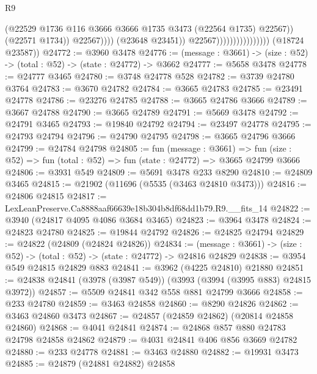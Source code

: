 \begin{lexlean}{R9}
\begin{coremodule}
                                                    (@22529
                                                      @1736
                                                      @116
                                                      @3666
                                                      @3666
                                                      @1735
                                                      @3473
                                                      (@22564 @1735)
                                                      @22567))
                                                  (@22571 @1734))
                                                @22567))))
                                        (@23648 @23451))
                                      @22567))))))))))))))))
      (@18724 @23587))
@24772 := @3960 @3478
@24776 := (message : @3661) -> (size : @52) -> (total : @52) -> (state : @24772) -> @3662
@24777 := @5658 @3478
@24778 := @24777 @3465
@24780 := @3748 @24778 @528
@24782 := @3739 @24780 @3764
@24783 := @3670 @24782
@24784 := @3665 @24783
@24785 := @23491 @24778
@24786 := @23276 @24785
@24788 := @3665 @24786 @3666
@24789 := @3667 @24788
@24790 := @3665 @24789
@24791 := @5669 @3478
@24792 := @24791 @3465
@24793 := @19840 @24792
@24794 := @23497 @24778
@24795 := @24793 @24794
@24796 := @24790 @24795
@24798 := @3665 @24796 @3666
@24799 := @24784 @24798
@24805 := fun (message : @3661) =>
  fun (size : @52) => fun (total : @52) => fun (state : @24772) => @3665 @24799 @3666
@24806 := @3931 @549
@24809 := @5691 @3478 @233 @8290
@24810 := @24809 @3465
@24815 := @21902 (@11696 (@5535 (@3463 @24810 @3473)))
@24816 := @24806 @24815
@24817 := LexLeanPreserve.Ca8888aaf66639e18b304b8df68dd1b79.R9.__fits_14
@24822 := @3940 (@24817 @4095 @4086 @3684 @3465)
@24823 := @3964 @3478
@24824 := @24823 @24780
@24825 := @19844 @24792
@24826 := @24825 @24794
@24829 := @24822 (@24809 (@24824 @24826))
@24834 := (message : @3661) -> (size : @52) -> (total : @52) -> (state : @24772) -> @24816 @24829
@24838 := @3954 @549 @24815 @24829 @883
@24841 := @3962 (@4225 @24810) @21880
@24851 := @24838 @24841 (@3978 (@3987 @549)) (@3993 (@3994 (@3995 @883) @24815 @3972))
@24857 := @5509 @24841 @342 @558 @881 @24799 @3666
@24858 := @233 @24780
@24859 := @3463 @24858
@24860 := @8290 @24826
@24862 := @3463 @24860 @3473
@24867 := @24857 (@24859 @24862) (@20814 @24858 @24860)
@24868 := @4041 @24841
@24874 := @24868 @857 @880 @24783 @24798 @24858 @24862
@24879 := @4031 @24841 @406 @856 @3669 @24782
@24880 := @233 @24778
@24881 := @3463 @24880
@24882 := @19931 @3473
@24885 := @24879 (@24881 @24882) @24858

\end{coremodule}
\end{lexlean}
